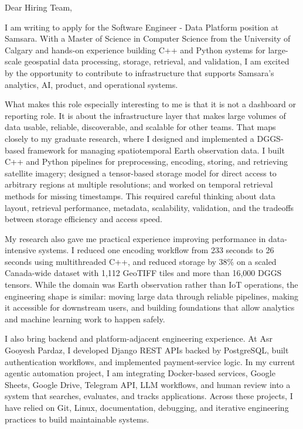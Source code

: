 \documentclass[11pt]{letter}
\begin{document}
\begin{letter}{}

\opening{Dear Hiring Team,}

I am writing to apply for the Software Engineer - Data Platform position at Samsara. With a Master of Science in Computer Science from the University of Calgary and hands-on experience building C++ and Python systems for large-scale geospatial data processing, storage, retrieval, and validation, I am excited by the opportunity to contribute to infrastructure that supports Samsara's analytics, AI, product, and operational systems.

What makes this role especially interesting to me is that it is not a dashboard or reporting role. It is about the infrastructure layer that makes large volumes of data usable, reliable, discoverable, and scalable for other teams. That maps closely to my graduate research, where I designed and implemented a DGGS-based framework for managing spatiotemporal Earth observation data. I built C++ and Python pipelines for preprocessing, encoding, storing, and retrieving satellite imagery; designed a tensor-based storage model for direct access to arbitrary regions at multiple resolutions; and worked on temporal retrieval methods for missing timestamps. This required careful thinking about data layout, retrieval performance, metadata, scalability, validation, and the tradeoffs between storage efficiency and access speed.

My research also gave me practical experience improving performance in data-intensive systems. I reduced one encoding workflow from 233 seconds to 26 seconds using multithreaded C++, and reduced storage by 38\% on a scaled Canada-wide dataset with 1,112 GeoTIFF tiles and more than 16,000 DGGS tensors. While the domain was Earth observation rather than IoT operations, the engineering shape is similar: moving large data through reliable pipelines, making it accessible for downstream users, and building foundations that allow analytics and machine learning work to happen safely.

I also bring backend and platform-adjacent engineering experience. At Asr Gooyesh Pardaz, I developed Django REST APIs backed by PostgreSQL, built authentication workflows, and implemented payment-service logic. In my current agentic automation project, I am integrating Docker-based services, Google Sheets, Google Drive, Telegram API, LLM workflows, and human review into a system that searches, evaluates, and tracks applications. Across these projects, I have relied on Git, Linux, documentation, debugging, and iterative engineering practices to build maintainable systems.


\end{letter}
\end{document}
